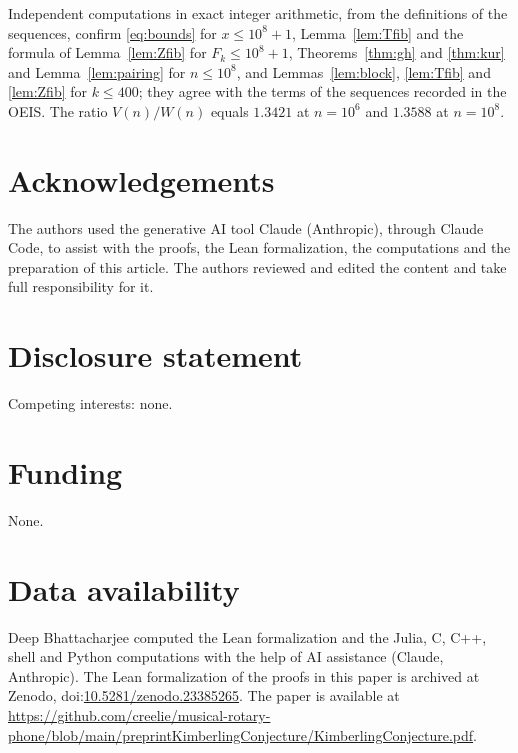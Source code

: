 \documentclass[]{interact}
\newcommand{\zenodoID}{10.5281/zenodo.23385265}
\newcommand{\preprintURL}{https://github.com/creelie/musical-rotary-phone/blob/main/preprintKimberlingConjecture/KimberlingConjecture.pdf}
\theoremstyle{plain}
\numberwithin{equation}{section}
\theoremstyle{definition}
\begin{document}
Independent computations in exact integer arithmetic, from the definitions of the sequences, confirm \eqref{eq:bounds} for $x\le10^8+1$, Lemma~\ref{lem:Tfib} and the formula of Lemma~\ref{lem:Zfib} for $F_k\le10^8+1$, Theorems~\ref{thm:gh} and \ref{thm:kur} and Lemma~\ref{lem:pairing} for $n\le10^8$, and Lemmas~\ref{lem:block}, \ref{lem:Tfib} and \ref{lem:Zfib} for $k\le400$; they agree with the terms of the sequences recorded in the OEIS. The ratio $V(n)/W(n)$ equals $1.3421$ at $n=10^6$ and $1.3588$ at $n=10^8$.

\section*{Acknowledgements}
The authors used the generative AI tool Claude (Anthropic), through Claude Code, to assist with the proofs, the Lean formalization, the computations and the preparation of this article. The authors reviewed and edited the content and take full responsibility for it.

\section*{Disclosure statement}
Competing interests: none.

\section*{Funding}
None.

\section*{Data availability}
\begingroup\raggedright
Deep Bhattacharjee computed the Lean formalization and the Julia, C, C++, shell and Python computations with the help of AI assistance (Claude, Anthropic). The Lean formalization of the proofs in this paper is archived at Zenodo, doi:\href{https://doi.org/\zenodoID}{\zenodoID}. The paper is available at \url{\preprintURL}.\par
\endgroup
\end{document}

